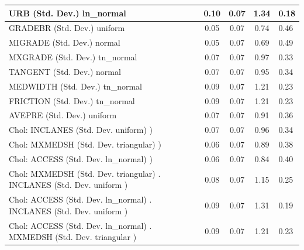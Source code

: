 \begin{table}
\begin{center}
\begin{tabular}{|l|l|c|c|c|l|}
			URB (Std. Dev.) ln_normal &  & 0.10 & 0.07 & 1.34 & 0.18 \\
			\hline
			GRADEBR (Std. Dev.) uniform &  & 0.05 & 0.07 & 0.74 & 0.46 \\
			\hline
			MIGRADE (Std. Dev.) normal &  & 0.05 & 0.07 & 0.69 & 0.49 \\
			\hline
			MXGRADE (Std. Dev.) tn_normal &  & 0.07 & 0.07 & 0.97 & 0.33 \\
			\hline
			TANGENT (Std. Dev.) normal &  & 0.07 & 0.07 & 0.95 & 0.34 \\
			\hline
			MEDWIDTH (Std. Dev.) tn_normal &  & 0.09 & 0.07 & 1.21 & 0.23 \\
			\hline
			FRICTION (Std. Dev.) tn_normal &  & 0.09 & 0.07 & 1.21 & 0.23 \\
			\hline
			AVEPRE (Std. Dev.) uniform &  & 0.07 & 0.07 & 0.91 & 0.36 \\
			\hline
			 Chol: INCLANES (Std. Dev. uniform) ) &  & 0.07 & 0.07 & 0.96 & 0.34 \\
			\hline
			 Chol: MXMEDSH (Std. Dev. triangular) ) &  & 0.06 & 0.07 & 0.89 & 0.38 \\
			\hline
			 Chol: ACCESS (Std. Dev. ln_normal) ) &  & 0.06 & 0.07 & 0.84 & 0.40 \\
			\hline
			 Chol: MXMEDSH (Std. Dev. triangular) . INCLANES (Std. Dev.   uniform ) &  & 0.08 & 0.07 & 1.15 & 0.25 \\
			\hline
			 Chol: ACCESS (Std. Dev. ln_normal) . INCLANES (Std. Dev.   uniform ) &  & 0.09 & 0.07 & 1.31 & 0.19 \\
			\hline
			 Chol: ACCESS (Std. Dev. ln_normal) . MXMEDSH (Std. Dev.   triangular ) &  & 0.09 & 0.07 & 1.21 & 0.23 \\
			\hline
		\end{tabular}
	\end{center}
\end{table}
